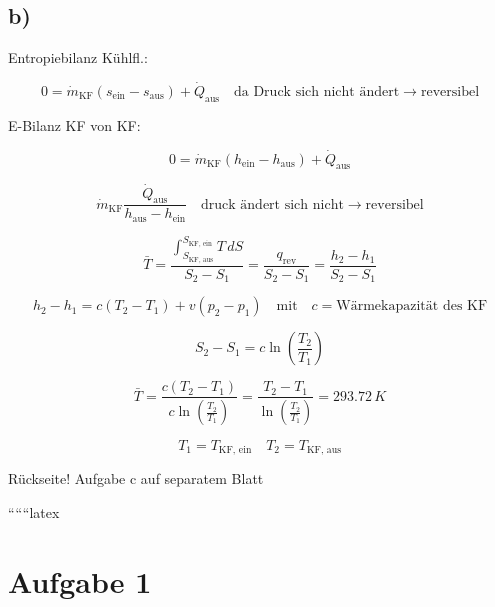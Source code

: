 

\subsection*{b)}

Entropiebilanz Kühlfl.:

\[
0 = \dot{m}_{\text{KF}} (s_{\text{ein}} - s_{\text{aus}}) + \dot{Q}_{\text{aus}} \quad \text{da Druck sich nicht ändert} \rightarrow \text{reversibel}
\]

E-Bilanz KF von KF:

\[
0 = \dot{m}_{\text{KF}} (h_{\text{ein}} - h_{\text{aus}}) + \dot{Q}_{\text{aus}}
\]

\[
\dot{m}_{\text{KF}} \frac{\dot{Q}_{\text{aus}}}{h_{\text{aus}} - h_{\text{ein}}} \quad \text{druck ändert sich nicht} \rightarrow \text{reversibel}
\]

\[
\bar{T} = \frac{\int_{S_{\text{KF, aus}}}^{S_{\text{KF, ein}}} T \, dS}{S_2 - S_1} = \frac{q_{\text{rev}}}{S_2 - S_1} = \frac{h_2 - h_1}{S_2 - S_1}
\]

\[
h_2 - h_1 = c (T_2 - T_1) + v (p_2 - p_1) \quad \text{mit} \quad c = \text{Wärmekapazität des KF}
\]

\[
S_2 - S_1 = c \ln \left( \frac{T_2}{T_1} \right)
\]

\[
\bar{T} = \frac{c (T_2 - T_1)}{c \ln \left( \frac{T_2}{T_1} \right)} = \frac{T_2 - T_1}{\ln \left( \frac{T_2}{T_1} \right)} = 293.72 \, K
\]

\[
T_1 = T_{\text{KF, ein}} \quad T_2 = T_{\text{KF, aus}}
\]

Rückseite! Aufgabe c auf separatem Blatt

``````latex


\section*{Aufgabe 1}